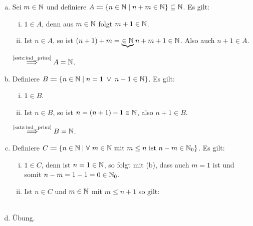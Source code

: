 \documentclass[../ana1.tex]{subfiles}
\begin{document}
\begin{bew}\leavevmode
	\begin{enumerate}[(a)]
		\item Sei \(m \in \mathbb{N} \) und definiere \(A \coloneqq \{n \in \mathbb{N}  \; \vert  \; n + m \in \mathbb{N}\} \subseteq \mathbb{N} \). Es gilt:
			  \begin{enumerate}[(i)]
				\item \(1 \in A \), denn aus \(m \in \mathbb{N} \) folgt \(m + 1 \in \mathbb{N} \).
				\item Ist \(n \in A \), so ist \((n + 1) + m = \underbrace{\in \mathbb{N}}{n + m} + 1 \in \mathbb{N} \).
					  Also auch \(n + 1 \in A \).
			  \end{enumerate}
			  \(\oversett{\autoref{satz:ind_prinz}}{\implies} A = \N \).
		\item Definiere \(B \coloneqq \{n \in \mathbb{N}  \; \vert  \; n = 1  \; \vee  \; n - 1 \in \mathbb{N}\} \). Es gilt:
			  \begin{enumerate}[(i)]
				\item \(1 \in B \).
				\item Ist \(n \in B \), so ist \(n = (n + 1) - 1 \in \mathbb{N} \), also \(n + 1 \in B \).
			  \end{enumerate}
			  \(\oversett{\autoref{satz:ind_prinz}}{\implies} B = \N \).
		\item Definiere \(C \coloneqq \set{n \in \N  \; \vert  \; \forall \, m \in \N \text{ mit } m \leq n \text{ ist } n - m \in \N_{0}} \). Es gilt:
			  \begin{enumerate}[(i)]
				\item \(1 \in C \), denn ist \(n = 1 \in \mathbb{N} \), so folgt mit (b), dass auch \(m = 1 \) ist und somit
					  \(n - m = 1 - 1 = 0 \in \mathbb{N}_{0} \).
				\item Ist \(n \in C \) und \(m \in \mathbb{N} \) mit \(m \leq n + 1 \) so gilt: \\
					   \\
			  \end{enumerate}
		\item Übung.\qedhere
	\end{enumerate}
\end{bew}
\end{document}
